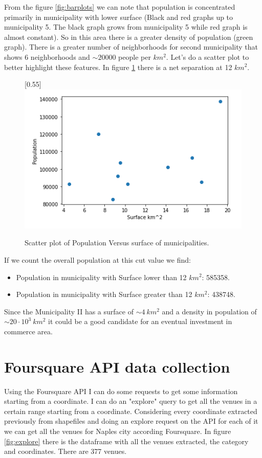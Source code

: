 \documentclass[a4paper, 12pt, oneside]{book}
\begin{document}
From the figure \ref{fig:barplots}  we can note that population is concentrated primarily in municipality with lower surface (Black and red graphs up to municipality 5. The black graph grows from municipality 5 while red graph is almost constant). So in this area there is a greater density of population (green graph). There is a greater number of neighborhoods for second municipality that shows 6 neighborhoods and $\sim 20000$ people per $km^2$.
Let's do a scatter plot to better highlight these features. In figure \ref{fig:population_surface} there is a net separation at 12 $km^2$. 

\begin{figure}[!htb]
		\centering
		\scalebox{0.5}[0.55]{\includegraphics{immagini/population_surface.png}}
		\caption{Scatter plot of Population Versus surface of municipalities.}
		\label{fig:population_surface}
	\end{figure}

If we count the overall population at this cut value we find: 
\begin{itemize}
\item Population in municipality with Surface lower than 12 $km^2$: 585358.
\item Population in municipality with Surface greater than 12 $km^2$: 438748.
\end{itemize}

Since the Municipality II has a surface of $\sim 4~km^2$ and a density in population of $\sim 20\cdot10^3~km^2$ it could be a good candidate for an eventual investment in commerce area. 

\section*{Foursquare API data collection}
\label{sec:foursquare}
Using the Foursquare API I can do some requests to get some information starting from a coordinate. I can do an "explore" query to get all the venues in a certain range starting from a coordinate. Considering every coordinate extracted previously from shapefiles and doing an explore request on the API for each of it we can get all the venues for Naples city according Foursquare. In figure \ref{fig:explore} there is the dataframe with all the venues extracted, the category and coordinates. There are 377 venues. 
\end{document}
